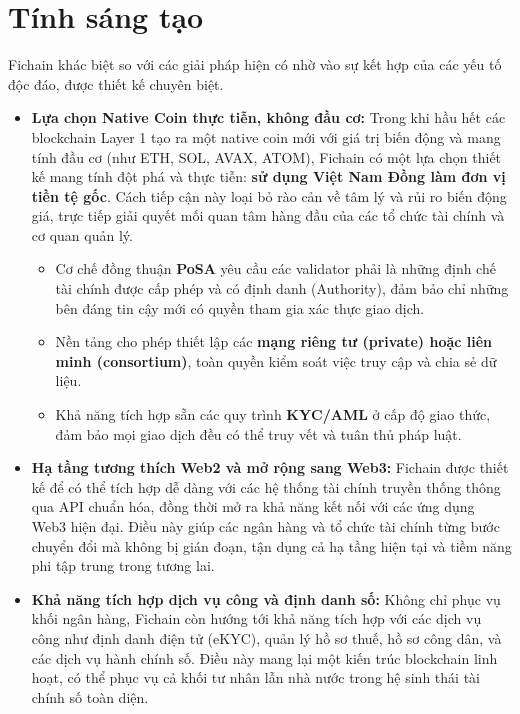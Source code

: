 \section{Tính sáng tạo}
Fichain khác biệt so với các giải pháp hiện có nhờ vào sự kết hợp của các yếu tố độc đáo, được thiết kế chuyên biệt.

\begin{itemize}
  \item \textbf{Lựa chọn Native Coin thực tiễn, không đầu cơ:} Trong khi hầu hết các blockchain Layer 1 tạo ra một native coin mới với giá trị biến động và mang tính đầu cơ (như ETH\cite{buterin2014ethereum}, SOL\cite{yakovenko2017solana}, AVAX\cite{rocket2019scalable}, ATOM\cite{kwon2016cosmos}), Fichain có một lựa chọn thiết kế mang tính đột phá và thực tiễn: \textbf{sử dụng Việt Nam Đồng làm đơn vị tiền tệ gốc}. Cách tiếp cận này loại bỏ rào cản về tâm lý và rủi ro biến động giá, trực tiếp giải quyết mối quan tâm hàng đầu của các tổ chức tài chính và cơ quan quản lý.

  \begin{itemize}
        \item Cơ chế đồng thuận \textbf{PoSA} yêu cầu các validator phải là những định chế tài chính được cấp phép và có định danh (Authority), đảm bảo chỉ những bên đáng tin cậy mới có quyền tham gia xác thực giao dịch.
        \item Nền tảng cho phép thiết lập các \textbf{mạng riêng tư (private) hoặc liên minh (consortium)}, toàn quyền kiểm soát việc truy cập và chia sẻ dữ liệu.
        \item Khả năng tích hợp sẵn các quy trình \textbf{KYC/AML} ở cấp độ giao thức, đảm bảo mọi giao dịch đều có thể truy vết và tuân thủ pháp luật.
  \end{itemize}
    

    \item \textbf{Hạ tầng tương thích Web2 và mở rộng sang Web3:} Fichain được thiết kế để có thể tích hợp dễ dàng với các hệ thống tài chính truyền thống thông qua API chuẩn hóa, đồng thời mở ra khả năng kết nối với các ứng dụng Web3 hiện đại. Điều này giúp các ngân hàng và tổ chức tài chính từng bước chuyển đổi mà không bị gián đoạn, tận dụng cả hạ tầng hiện tại và tiềm năng phi tập trung trong tương lai.

    \item \textbf{Khả năng tích hợp dịch vụ công và định danh số:} Không chỉ phục vụ khối ngân hàng, Fichain còn hướng tới khả năng tích hợp với các dịch vụ công như định danh điện tử (eKYC), quản lý hồ sơ thuế, hồ sơ công dân, và các dịch vụ hành chính số. Điều này mang lại một kiến trúc blockchain linh hoạt, có thể phục vụ cả khối tư nhân lẫn nhà nước trong hệ sinh thái tài chính số toàn diện.


\end{itemize}
